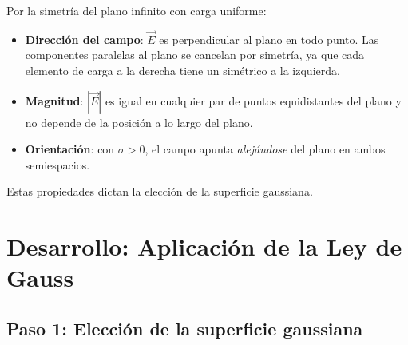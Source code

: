 \documentclass[12pt,letterpaper]{article}
\begin{document}
Por la simetr\'ia del plano infinito con carga uniforme:
\begin{itemize}
    \item \textbf{Direcci\'on del campo}: $\vec{E}$ es perpendicular al plano en todo punto.
          Las componentes paralelas al plano se cancelan por simetr\'ia, ya que cada
          elemento de carga a la derecha tiene un sim\'etrico a la izquierda.
    \item \textbf{Magnitud}: $|\vec{E}|$ es igual en cualquier par de puntos equidistantes
          del plano y no depende de la posici\'on a lo largo del plano.
    \item \textbf{Orientaci\'on}: con $\sigma > 0$, el campo apunta \emph{alej\'andose} del
          plano en ambos semiespacios.
\end{itemize}
Estas propiedades dictan la elecci\'on de la superficie gaussiana.

\section*{Desarrollo: Aplicaci\'on de la Ley de Gauss}

\subsection*{Paso 1: Elecci\'on de la superficie gaussiana}
\end{document}
